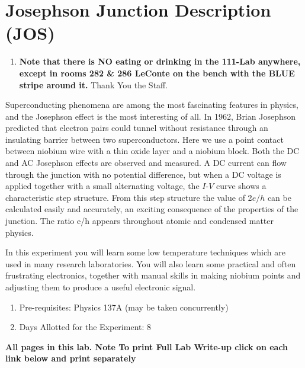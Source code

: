 \documentclass{../lab}
\begin{document}
\maketitle

\tableofcontents

\section{Josephson Junction Description (JOS)}

\begin{enumerate}
    \item \textbf{Note that there is NO eating or drinking in the 111-Lab anywhere, except in rooms 282 \& 286 LeConte on the bench with the BLUE stripe around it.} Thank You the Staff.
\end{enumerate}

Superconducting phenomena are among the most fascinating features in physics, and the Josephson effect is the most interesting of all. In 1962, Brian Josephson predicted that electron pairs could tunnel without resistance through an insulating barrier between two superconductors. Here we use a point contact between niobium wire with a thin oxide layer and a niobium block. Both the DC and AC Josephson effects are observed and measured. A DC current can flow through the junction with no potential difference, but when a DC voltage is applied together with a small alternating voltage, the $I$-$V$ curve shows a characteristic step structure. From this step structure the value of 2$e/h$ can be calculated easily and accurately, an exciting consequence of the properties of the junction. The ratio e/h appears throughout atomic and condensed matter physics.

In this experiment you will learn some low temperature techniques which are used in many research laboratories. You will also learn some practical and often frustrating electronics, together with manual skills in making niobium points and adjusting them to produce a useful electronic signal.

\begin{enumerate}
    \item Pre-requisites: Physics 137A (may be taken concurrently)

    \item Days Allotted for the Experiment: 8
\end{enumerate}

\textbf{All pages in this lab. Note To print Full Lab Write-up click on each link below and print separately }
\end{document}
